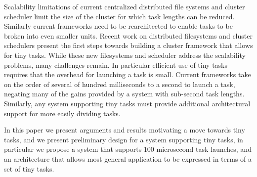 Scalability limitations of current centralized distributed file systems and cluster
scheduler limit the size of the cluster for which task lengths can be reduced. Similarly
current frameworks need to be rearchitected to enable tasks to be broken into even smaller
units. 
Recent work on distributed filesystems\cite{nightingale2012flat} and cluster schedulers\cite{sparrow}
present the first steps towards
building a cluster framework that allows for tiny tasks. While these new filesystems
and scheduler address the scalability problems, many challenges remain. In particular
efficient use of tiny tasks requires that the overhead for launching a task is small. Current
frameworks take on the order of several of hundred milliseconds to a second to launch a task, negating
many of the gains provided by a system with sub-second task lengths. Similarly, any system
supporting tiny tasks must provide additional architectural support for more easily dividing tasks.

In this paper we present arguments and results motivating a move towards tiny tasks,
and we present preliminary design for a system supporting tiny tasks, in particular
we propose a system that supports $100$ microsecond task launches, and an architecture
that allows most general application to be expressed in terms of a set of tiny tasks.

